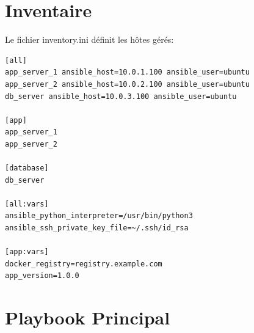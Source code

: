 \documentclass[12pt,a4paper]{report}
\begin{document}
\section{Inventaire}

Le fichier inventory.ini définit les hôtes gérés:

\begin{lstlisting}
[all]
app_server_1 ansible_host=10.0.1.100 ansible_user=ubuntu
app_server_2 ansible_host=10.0.2.100 ansible_user=ubuntu
db_server ansible_host=10.0.3.100 ansible_user=ubuntu

[app]
app_server_1
app_server_2

[database]
db_server

[all:vars]
ansible_python_interpreter=/usr/bin/python3
ansible_ssh_private_key_file=~/.ssh/id_rsa

[app:vars]
docker_registry=registry.example.com
app_version=1.0.0
\end{lstlisting}

\section{Playbook Principal}
\end{document}
